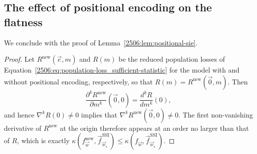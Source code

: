 \subsection{The effect of positional encoding on the flatness}

We conclude with the proof of Lemma~\ref{2506:lem:positional-sie}.

\begin{proof}
    Let $R^{\mathrm{new}}(\vec{e}, m)$ and $R(m)$ be the reduced population losses of Equation~\eqref{2506:eq:population-loss_sufficient-statistic} for the model with and without positional encoding, respectively, so that $R(m) = R^{\mathrm{new}}(\vec{0}, m)$. Then
    \[ \frac{\partial^k R^{\mathrm{new}}}{\partial m^k}(\vec{0}, 0) = \frac{d^k R}{dm^k}(0), \]
    and hence $\nabla^k R(0) \neq 0$ implies that $\nabla^k R^{\mathrm{new}}(\vec{0}, 0) \neq 0$. The first non-vanishing derivative of $R^{\mathrm{new}}$ at the origin therefore appears at an order no larger than that of $R$, which is exactly $\kappa(f_{\vec{w}}^{\mathrm{new}}, \vec{f}^\mathrm{SSI}_{\vec w_{\star}}) \leq \kappa(f_{\vec{w}}, \vec{f}^\mathrm{SSI}_{\vec w_{\star}})$.
\end{proof}
